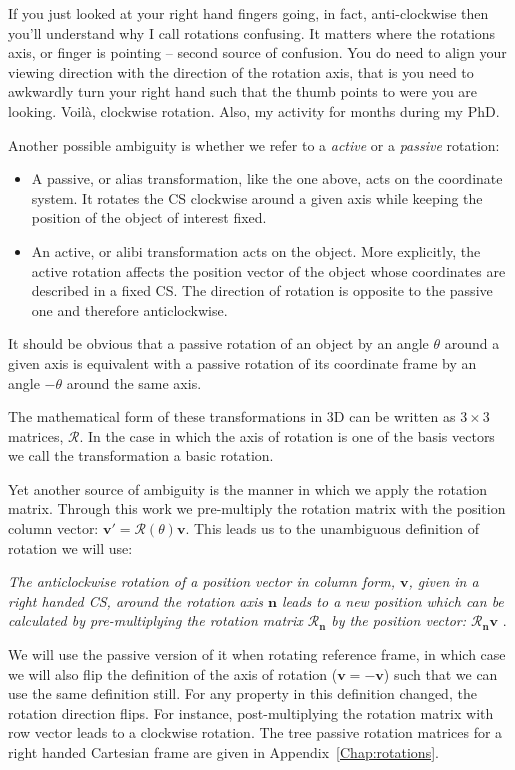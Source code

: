 If you just looked at your right hand fingers going, in fact, anti-clockwise then you'll understand why I call rotations confusing. It matters where the rotations axis, or finger is pointing -- second source of confusion. You do need to align your viewing direction with the direction of the rotation axis, that is you need to awkwardly turn your right hand such that the thumb points to were you are looking. Voil\`{a}, clockwise rotation. Also, my activity for months during my PhD. 

Another possible ambiguity is whether we refer to a \textit{active} or a \textit{passive} rotation:
\begin{itemize}
\item A passive, or alias transformation, like the one above, acts on the coordinate system. It rotates the CS clockwise around a given axis while keeping the position of the object of interest fixed.
\item An active, or alibi transformation acts on the object. More explicitly, the active rotation affects the position vector of the object whose coordinates are described in a fixed CS. The direction of rotation is opposite to the passive one and therefore anticlockwise.
\end{itemize}
It should be obvious that a passive rotation of an object by an angle $\theta$ around a given axis is equivalent with a passive rotation of its coordinate frame by an angle $-\theta$ around the same axis.

The mathematical form of these transformations in 3D can be written as $3\times 3$ matrices, $\mathcal{R}$. In the case in which the axis of rotation is one of the basis vectors we call the transformation a basic rotation. 

Yet another source of ambiguity is the manner in which we apply the rotation matrix. Through this work we pre-multiply the rotation matrix with the position column vector: $\mathbf{v'}=\mathcal{R}(\theta)\mathbf{v}$. This leads us to the unambiguous definition of rotation we will use: 

\textit{The anticlockwise rotation of a position vector in column form, $\mathbf{v}$, given in a right handed CS, around the rotation axis $\mathbf{n}$ leads to a new position which can be calculated by pre-multiplying the rotation matrix $\mathcal{R_{\mathbf{n}}}$ by the position vector: $\mathcal{R_{\mathbf{n}}} \mathbf{v}$ }. 

We will use the passive version of it when rotating reference frame, in which case we will also flip the definition of the axis of rotation ($\mathbf{v} = -\mathbf{v}$) such that we can use the same definition still. For any property in this definition changed, the rotation direction flips. For instance, post-multiplying the rotation matrix with row vector leads to a clockwise rotation. The tree passive rotation matrices for a right handed Cartesian frame are given in Appendix~\ref{Chap:rotations}. 

